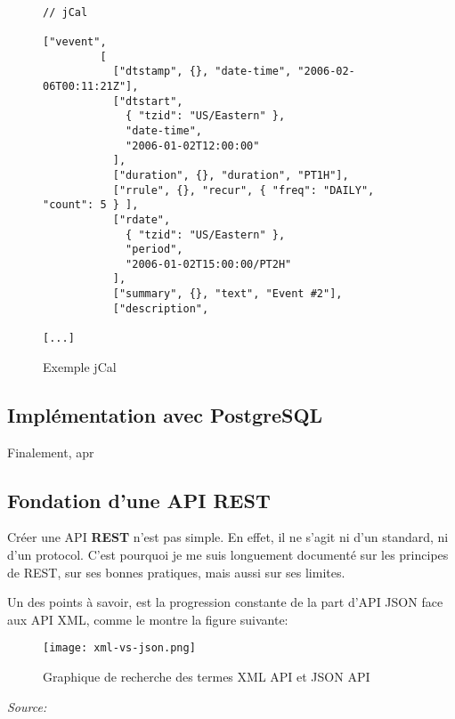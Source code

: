 \newpage

\begin{figure}[h]
\begin{lstlisting}[frame=single]

// jCal

["vevent",
         [
           ["dtstamp", {}, "date-time", "2006-02-06T00:11:21Z"],
           ["dtstart",
             { "tzid": "US/Eastern" },
             "date-time",
             "2006-01-02T12:00:00"
           ],
           ["duration", {}, "duration", "PT1H"],
           ["rrule", {}, "recur", { "freq": "DAILY", "count": 5 } ],
           ["rdate",
             { "tzid": "US/Eastern" },
             "period",
             "2006-01-02T15:00:00/PT2H"
           ],
           ["summary", {}, "text", "Event #2"],
           ["description",

[...]

\end{lstlisting}
\caption{Exemple jCal}
\end{figure}

\subsection{Implémentation avec PostgreSQL}

Finalement, apr

\subsection{Fondation d'une API REST}

Créer une API \textbf{REST} n'est pas simple. En effet, il ne s'agit ni d'un standard, ni d'un protocol. C'est pourquoi je me suis longuement documenté sur les principes de REST, sur ses bonnes pratiques, mais aussi sur ses limites. 

Un des points à savoir, est la progression constante de la part d'API JSON face aux API XML, comme le montre la figure suivante:

\begin{figure}[h]
\begin{center}
\texttt{[image: xml-vs-json.png]}
\end{center}
\caption{Graphique de recherche des termes XML API et JSON API}
\end{figure}

\newpage

\textit{Source: }

